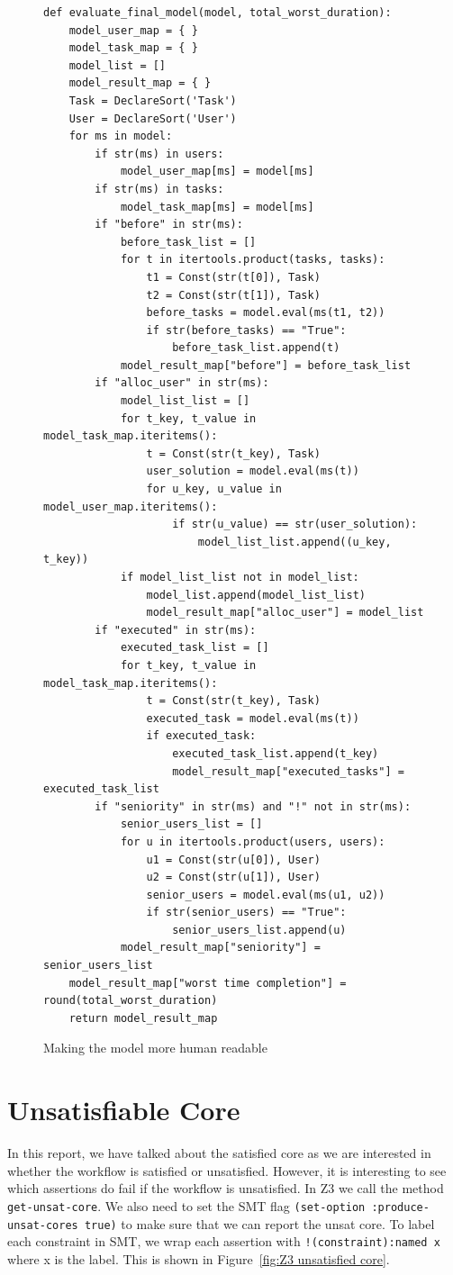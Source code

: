 \documentclass[a4paper]{report}
\begin{document}
\begin{figure}[H]
\lstset{numbers=left, showspaces=false,
    showstringspaces=false, tabsize=2, breaklines=true,
    xleftmargin=5.0ex,
}
\begin{lstlisting}[frame=single]
def evaluate_final_model(model, total_worst_duration):
	model_user_map = { }
	model_task_map = { }
	model_list = []
	model_result_map = { }
	Task = DeclareSort('Task')
	User = DeclareSort('User')
	for ms in model:
		if str(ms) in users:
			model_user_map[ms] = model[ms]
		if str(ms) in tasks:
			model_task_map[ms] = model[ms]
		if "before" in str(ms):
			before_task_list = []
			for t in itertools.product(tasks, tasks):
				t1 = Const(str(t[0]), Task)
				t2 = Const(str(t[1]), Task)
				before_tasks = model.eval(ms(t1, t2))
				if str(before_tasks) == "True":
					before_task_list.append(t)
			model_result_map["before"] = before_task_list
		if "alloc_user" in str(ms):
			model_list_list = []
			for t_key, t_value in model_task_map.iteritems():
				t = Const(str(t_key), Task)
				user_solution = model.eval(ms(t))
				for u_key, u_value in model_user_map.iteritems():
					if str(u_value) == str(user_solution):
						model_list_list.append((u_key, t_key))
			if model_list_list not in model_list:
				model_list.append(model_list_list)
				model_result_map["alloc_user"] = model_list
		if "executed" in str(ms):
			executed_task_list = []
			for t_key, t_value in model_task_map.iteritems():
				t = Const(str(t_key), Task)
				executed_task = model.eval(ms(t))
				if executed_task:
					executed_task_list.append(t_key)
					model_result_map["executed_tasks"] = executed_task_list
		if "seniority" in str(ms) and "!" not in str(ms):
			senior_users_list = []
			for u in itertools.product(users, users):
				u1 = Const(str(u[0]), User)
				u2 = Const(str(u[1]), User)
				senior_users = model.eval(ms(u1, u2))
				if str(senior_users) == "True":
					senior_users_list.append(u)
			model_result_map["seniority"] = senior_users_list
	model_result_map["worst time completion"] = round(total_worst_duration)
	return model_result_map
\end{lstlisting}
\caption{Making the model more human readable}
\label{fig:Making the model more human readable}
\end{figure}

\section{Unsatisfiable Core}
In this report, we have talked about the satisfied core as we are interested in whether the workflow is satisfied or unsatisfied. However, it is interesting to see which assertions do fail if the workflow is unsatisfied. In Z3 we call the method \texttt{get-unsat-core}. We also need to set the SMT flag \texttt{(set-option :produce-unsat-cores true)} to make sure that we can report the unsat core. To label each constraint in SMT, we wrap each assertion with \texttt{!(constraint):named x} where x is the label. This is shown in Figure~\ref{fig:Z3 unsatisfied core}. \\
\end{document}
